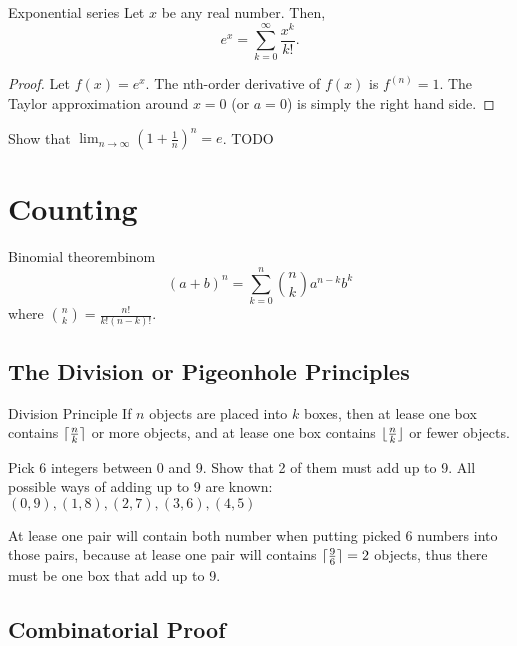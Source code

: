 \documentclass[11pt,a4paper,fleqn]{article}
\numberwithin{equation}{section}
\DeclarePairedDelimiter\ceil{\lceil}{\rceil}
\DeclarePairedDelimiter\floor{\lfloor}{\rfloor}
\begin{document}
\begin{fact}{Exponential series}{}
    Let $x$ be any real number. Then,
    \[
    e^x = \sum_{k=0}^{\infty}\frac{x^k}{k!}.
    \]
    \tcblower
    \begin{proof}
        Let $f(x) = e^x$.
        The nth-order derivative of $f(x)$ is $f^{(n)}=1$.
        The Taylor approximation around $x=0$ (or $a=0$) is simply the right hand side.
    \end{proof}
\end{fact}

\begin{exec}
    Show that $\lim_{n\rightarrow\infty}(1+\frac{1}{n})^n=e$.
    \tcblower
    TODO
\end{exec}

\section{Counting}
\begin{fact}{Binomial theorem}{binom}
    \[
    (a+b)^n = \sum_{k=0}^n \binom{n}{k} a^{n-k}b^k
    \]
    where $\binom{n}{k} = \frac{n!}{k!(n-k)!}$.
\end{fact}

\subsection{The Division or Pigeonhole Principles}

\begin{fact}{Division Principle}{}
    If $n$ objects are placed into $k$ boxes,
    then at lease one box contains $\ceil{\frac{n}{k}}$ or more objects,
    and at lease one box contains $\floor{\frac{n}{k}}$ or fewer objects.
\end{fact}

\begin{exec}
    Pick 6 integers between 0 and 9. Show that 2 of them must add up to 9.
    \tcblower
    All possible ways of adding up to 9 are known:
    $(0,9),(1,8),(2,7),(3,6),(4,5)$

    At lease one pair will contain both number when putting picked 6 numbers into those pairs, because at lease one pair will contains $\ceil{\frac{9}{6}}=2$ objects, thus there must be one box that add up to 9.
\end{exec}

\subsection{Combinatorial Proof}
\end{document}
